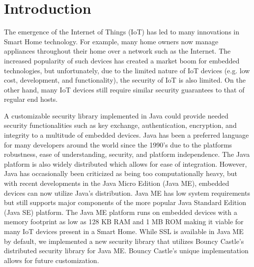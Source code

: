 \section{Introduction}
The emergence of the Internet of Things (IoT) has led to many innovations in Smart Home technology. For example, many home owners now manage appliances throughout their home over a network such as the Internet. The increased popularity of such devices has created a market boom for embedded technologies, but unfortunately, due to the limited nature of IoT devices (e.g. low cost, development, and functionality), the security of IoT is also limited. On the other hand, many IoT devices still require similar security guarantees to that of regular end hosts.

A customizable security library implemented in Java could provide needed security functionalities such as key exchange, authentication, encryption, and integrity to a multitude of embedded devices. Java has been a preferred language for many developers around the world since the 1990's due to the platforms robustness, ease of understanding, security, and platform independence. The Java platform is also widely distributed which allows for ease of integration. However, Java has occasionally been criticized as being too computationally heavy, but with recent developments in the Java Micro Edition (Java ME), embedded devices can now utilize Java's distribution. Java ME has low system requirements but still supports major components of the more popular Java Standard Edition (Java SE) platform. The Java ME platform runs on embedded devices with a memory footprint as low as 128 KB RAM and 1 MB ROM making it viable for many IoT devices present in a Smart Home. While SSL is available in Java ME by default, we implemented a new security library that utilizes Bouncy Castle's distributed security library for Java ME. Bouncy Castle's unique implementation allows for future customization.

